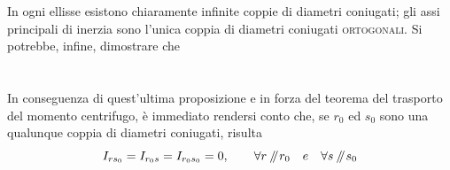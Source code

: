\noindent In ogni ellisse esistono chiaramente infinite coppie di diametri coniugati; gli assi principali di inerzia sono l'unica coppia di diametri coniugati \textsc{ortogonali}. Si potrebbe, infine, dimostrare che 
\\

\\
\\

\noindent In conseguenza di quest'ultima proposizione e in forza del teorema del trasporto del momento centrifugo, è immediato rendersi conto che, se $r_0$ ed $s_0$ sono una qualunque coppia di diametri coniugati, risulta
\begin{equation*}
I_{rs_{0}} = I_{r_{0}s} = I_{r_{0}s_{0}} = 0, \qquad \forall r\,\mathbin{\!/\mkern-5mu/\!} r_0 \quad e \quad \forall s\,\mathbin{\!/\mkern-5mu/\!} s_0
\end{equation*}
